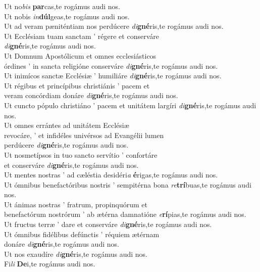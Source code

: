 %
\noindent
Ut no\textit{bis} \textbf{par}cas,\hfill te rogámus audi nos.\\
Ut nobis \textit{in}\textbf{dúl}geas,\hfill te rogámus audi nos.\\
Ut ad veram pæniténtiam nos perdúcere
\textit{di}\textbf{gné}ris,\hfill te rogámus audi nos.\\
Ut Ecclésiam tuam sanctam ’ régere et
conserváre\\
\emspace \textit{di}\textbf{gné}ris,\hfill te rogámus audi nos.\\
Ut Domnum Apostólicum et omnes
ecclesiásticos \\
\emspace órdines ’ in sancta  religióne conserváre \textit{di}\textbf{gné}ris,\hfill te rogámus audi nos.\\
Ut inimícos sanctæ Ecclésiæ ’ humiliáre
\textit{di}\textbf{gné}ris,\hfill te rogámus audi nos.\\
Ut régibus et princípibus christiánis ’ pacem et \\
\emspace veram concórdiam donáre \textit{di}\textbf{gné}ris,\hfill te rogámus audi nos.\\
Ut cun\-cto pópulo christiáno ’ pacem et
unitátem largíri \textit{di}\textbf{gné}ris,\hfill te rogámus audi nos.\\
Ut omnes errántes ad unitátem Ecclésiæ \\
\emspace
revocáre, ’ et infidéles univérsos ad Evangélii
lumen \\
\emspace perdúcere \textit{di}\textbf{gné}ris,\hfill te rogámus audi nos.\\
Ut nosmetípsos in tuo sancto servítio ’
confortáre \\
\emspace  et conserváre \textit{di}\textbf{gné}ris,\hfill te rogámus audi nos.\\
Ut mentes nostras ’ ad cæléstia desidéri\tinyhspace\textit{a}
\textbf{é}rigas,\hfill te rogámus audi nos.\\
Ut ómnibus benefactóribus nostris ’
sempitérna bona \textit{re}\textbf{trí}buas,\hfill te rogámus audi nos.\\
Ut ánimas nostras ’ fratrum, propinquórum et \\
\emspace benefactórum nostrórum ’ ab ætérna
damnatióne \textit{e}\textbf{rí}pias,\hfill te rogámus audi nos.\\
Ut fru\-ctus terræ ’ dare et conserváre
\textit{di}\textbf{gné}ris,\hfill te rogámus audi nos.\\
Ut ómnibus fidélibus defún\-ctis ’ réquiem
ætérnam \\
\emspace donáre \textit{di}\textbf{gné}ris,\hfill te rogámus audi nos.\\
Ut nos exaudíre \textit{di}\textbf{gné}ris,\hfill te rogámus audi nos.\\
Fi\tinyhspace\textit{li} \textbf{De}i,\hfill te rogámus audi nos.


